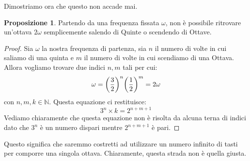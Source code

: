 \documentclass[12pt,a4paper]{report}
\theoremstyle{definition}
\theoremstyle{Theorem}
\newtheorem{Prop}[Def]{Proposizione}
\theoremstyle{definition}
\theoremstyle{definition}
\theoremstyle{definition}
\begin{document}
	Dimostriamo ora che questo non accade mai.
	\\
	 \begin{Prop}
	 	Partendo da una frequenza fissata $\omega$, non è possibile ritrovare un'ottava $2\omega$ semplicemente salendo di Quinte o scendendo di Ottave.
	 \end{Prop}
	 \begin{proof}
	 	Sia $\omega$ la nostra frequenza di partenza, sia $n$ il numero di volte in cui saliamo di una quinta e $m$ il numero di volte in cui scendiamo di una Ottava. Allora vogliamo trovare due indici $n,m$ tali per cui:
	 	$$\omega=\bigg({3\over 2}\bigg)^n\bigg({1\over 2}\bigg)^m=2\omega$$
	 	con $n,m,k\in \mathbb{N}$. Questa equazione ci restituisce:
	 	$$3^n\times k=2^{n+m+1}$$
	 	Vediamo chiaramente che questa equazione non è risolta da alcuna terna di indici dato che $3^n$ è un numero dispari mentre $2^{n+m+1}$ è pari.
	 \end{proof}
	 Questo significa che saremmo costretti ad utilizzare un numero infinito di tasti per comporre una singola ottava. Chiaramente, questa strada non è quella giusta.
\end{document}
